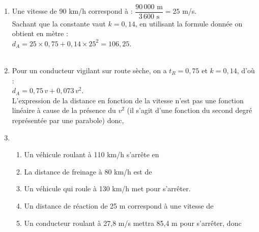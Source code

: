 \ \\ [-5mm]
\begin{enumerate}
   \item Une vitesse de 90 km/h correspond à : $\dfrac{90\,000\text{ m}}{3\,600\text{ s}} =25$ m/s. \\ [1mm]
   Sachant que la constante vaut $k =0,14$, en utilisant la formule donnée on obtient en mètre : \\
   $d_A =25\times0,75+0,14\times25^2 =106,25$. \\
    \\
   \item Pour un conducteur vigilant sur route sèche, on a $t_R =0,75$ et $k =0,14$, d'où : \\
   $d_A =0,75\,v+0,073\,v^2$. \\
       L'expression de la distance en fonction de la vitesse n'est pas une fonction linéaire à cause de la présence du \og $v^2$ \fg{} (il s'agit d'une fonction du second degré représentée par une parabole) donc, \\
   \item
   \begin{enumerate}
       \item Un véhicule roulant à 110 km/h s'arrête en 
       \item La distance de freinage à 80 km/h est de 
       \item Un véhicule qui roule à 130 km/h met  pour s'arrêter.
       \item Un distance de réaction de 25 m correspond à une vitesse de 
       \item Un conducteur roulant à 27,8 m/s mettra 85,4 m pour s'arrêter, donc 
    \end{enumerate}
\end{enumerate}
